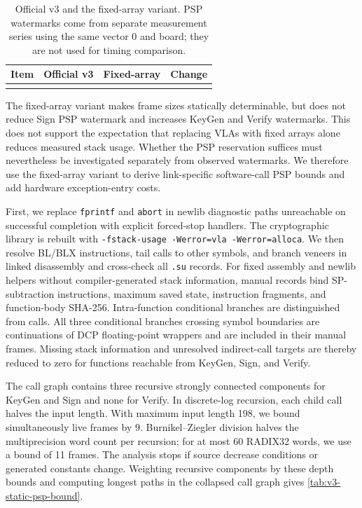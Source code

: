\documentclass[a4paper,10pt]{article}
\theoremstyle{definition}
\theoremstyle{remark}
\begin{document}
\begin{table}[H]
  \centering
  \caption{Official v3 and the fixed-array variant. PSP watermarks come from separate measurement series using the same vector 0 and board; they are not used for timing comparison.}
  \label{tab:v3-fixed-frame}
  \small
  \begin{tabular}{@{}lrrr@{}}
    \toprule
    Item & Official v3 & Fixed-array & Change \\
    \midrule
    \\
    \bottomrule
  \end{tabular}
\end{table}

The fixed-array variant makes frame sizes statically determinable, but does not reduce Sign PSP watermark and increases KeyGen and Verify watermarks. This does not support the expectation that replacing VLAs with fixed arrays alone reduces measured stack usage. Whether the PSP reservation suffices must nevertheless be investigated separately from observed watermarks. We therefore use the fixed-array variant to derive link-specific software-call PSP bounds and add hardware exception-entry costs.

First, we replace \texttt{fprintf} and \texttt{abort} in newlib diagnostic paths unreachable on successful completion with explicit forced-stop handlers. The cryptographic library is rebuilt with \texttt{-fstack-usage -Werror=vla -Werror=alloca}. We then resolve BL/BLX instructions, tail calls to other symbols, and branch veneers in linked disassembly and cross-check all \texttt{.su} records. For fixed assembly and newlib helpers without compiler-generated stack information, manual records bind SP-subtraction instructions, maximum saved state, instruction fragments, and function-body SHA-256. Intra-function conditional branches are distinguished from calls. All three conditional branches crossing symbol boundaries are continuations of DCP floating-point wrappers and are included in their manual frames. Missing stack information and unresolved indirect-call targets are thereby reduced to zero for functions reachable from KeyGen, Sign, and Verify.

The call graph contains three recursive strongly connected components for KeyGen and Sign and none for Verify. In discrete-log recursion, each child call halves the input length. With maximum input length 198, we bound simultaneously live frames by 9. Burnikel--Ziegler division halves the multiprecision word count per recursion; for at most 60 RADIX32 words, we use a bound of 11 frames. The analysis stops if source decrease conditions or generated constants change. Weighting recursive components by these depth bounds and computing longest paths in the collapsed call graph gives \cref{tab:v3-static-psp-bound}.
\end{document}
